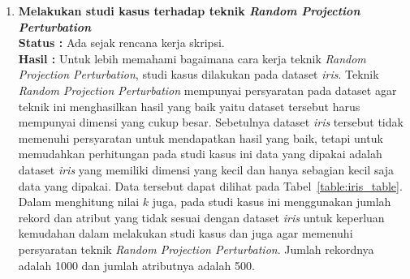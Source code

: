 \documentclass[a4paper,twoside]{article}
\begin{document}
\begin{enumerate}
		\item \textbf{Melakukan studi kasus terhadap teknik \textit{Random Projection Perturbation}}\\
		{\bf Status :} Ada sejak rencana kerja skripsi.\\
		{\bf Hasil :} Untuk lebih memahami bagaimana cara kerja teknik \textit{Random Projection Perturbation}, studi kasus dilakukan pada dataset \textit{iris}. Teknik \textit{Random Projection Perturbation} mempunyai persyaratan pada dataset agar teknik ini menghasilkan hasil yang baik yaitu dataset tersebut harus mempunyai dimensi yang cukup besar. Sebetulnya dataset \textit{iris} tersebut tidak memenuhi persyaratan untuk mendapatkan hasil yang baik, tetapi untuk memudahkan perhitungan pada studi kasus ini data yang dipakai adalah dataset \textit{iris} yang memiliki dimensi yang kecil dan hanya sebagian kecil saja data yang dipakai. Data tersebut dapat dilihat pada Tabel~\ref{table:iris_table}. Dalam menghitung nilai \(k\) juga, pada studi kasus ini menggunakan jumlah rekord dan atribut yang tidak sesuai dengan dataset \textit{iris} untuk keperluan kemudahan dalam melakukan studi kasus dan juga agar memenuhi persyaratan teknik \textit{Random Projection Perturbation}. Jumlah rekordnya adalah 1000 dan jumlah atributnya adalah 500.


\end{enumerate}
\end{document}
